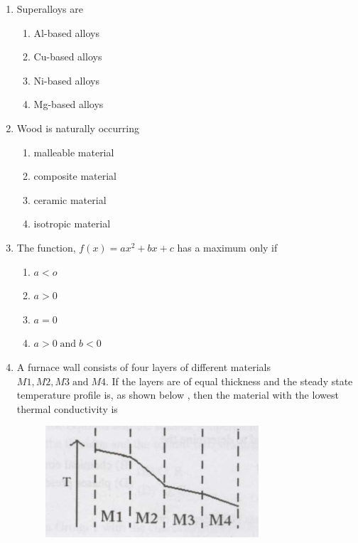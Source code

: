 \documentclass[journal]{IEEEtran}
\theoremstyle{remark}
\begin{document}
\begin{enumerate}
\item Superalloys are \hfill{}
\begin{multicols}{2}
\begin{enumerate}
\item Al-based alloys
\item Cu-based alloys
\item Ni-based alloys
\item Mg-based alloys
\end{enumerate}
\end{multicols}

\item Wood is naturally occurring 
\hfill{}
\begin{multicols}{2}
\begin{enumerate}
\item malleable material
\item composite material
\item ceramic material
\item isotropic material    
\end{enumerate}
\end{multicols}
\item The function, $f(x)=ax^2+bx+c$ has a maximum only if \hfill{}
\begin{multicols}{4}
\begin{enumerate}
        \item$a<o$
        \item $a>0$
        \item $a=0$
        \item $a>0\;\text{and}\;b<0$
\end{enumerate}
\end{multicols}
\item A furnace wall consists of four layers of different materials $M1,M2,M3 \;      \text{and}\; M4$. If the layers are of equal thickness and the steady state temperature profile is, as shown below , then the material with the lowest thermal conductivity is\hfill{}
\begin{figure}[H]
    \centering
    \includegraphics[width=0.5\linewidth]{figs/Q.12.png}

\end{figure}
\end{enumerate}
\end{document}
